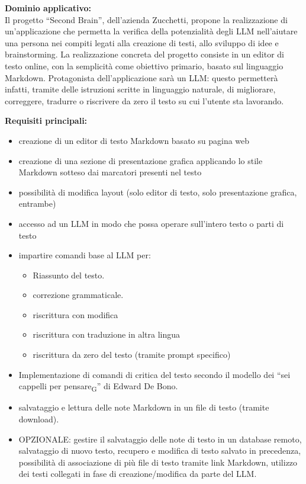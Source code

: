 \textbf{Dominio applicativo:} \\
{Il progetto “Second Brain”, dell’azienda Zucchetti, propone la realizzazione di un’applicazione che permetta la verifica della potenzialità degli LLM nell’aiutare una persona nei compiti legati alla creazione di testi, allo sviluppo di idee e brainstorming. La realizzazione concreta del progetto consiste in un editor di testo online, con la semplicità come obiettivo primario, basato sul linguaggio Markdown. Protagonista dell’applicazione sarà un LLM: questo permetterà infatti, tramite delle istruzioni scritte in linguaggio naturale, di migliorare, correggere, tradurre o riscrivere da zero il testo su cui l’utente sta lavorando.}

\vspace{0.3cm}
\textbf{Requisiti principali:}
\begin{itemize}
	\item {creazione di un editor di testo Markdown basato su pagina web}
	\item {creazione di una sezione di presentazione grafica applicando lo stile Markdown sotteso dai marcatori presenti nel testo}
    \item possibilità di modifica layout (solo editor di testo, solo presentazione grafica, entrambe)
    \item accesso ad un LLM in modo che possa operare sull’intero testo o parti di testo
    \item impartire comandi base al LLM per:
        \begin{itemize}
            \item Riassunto del testo.
            \item correzione grammaticale.
            \item riscrittura con modifica
            \item riscrittura con traduzione in altra lingua
            \item riscrittura da zero del testo (tramite prompt specifico)
        \end{itemize}
\item Implementazione di comandi di critica del testo secondo il modello dei “sei cappelli per pensare\textsubscript{G}” di Edward De Bono.
\item salvataggio e lettura delle note Markdown in un file di testo (tramite download).
\item OPZIONALE: gestire il salvataggio delle note di testo in un database remoto, salvataggio di nuovo testo, recupero e modifica di testo salvato in precedenza, possibilità di associazione di più file di testo tramite link Markdown, utilizzo dei testi collegati in fase di creazione/modifica da parte del LLM.
\end{itemize}

